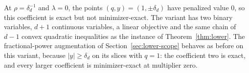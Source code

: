 At $\rho=\delta_d^{-1}$ and $\lambda=0$, the points $(q,y)=(1,\pm\delta_d)$
have penalized value $0$, so this coefficient is exact but not
minimizer-exact. The variant has two binary variables, $d+1$ continuous
variables, a linear objective and the same chain of $d-1$ convex
quadratic inequalities as the instance of Theorem~\ref{thm:lower}. The
fractional-power augmentation of Section~\ref{sec:lower-scope} behaves
as before on this variant, because $|y|\ge\delta_d$ on its slices with
$q=1$: the coefficient two is exact, and every larger coefficient is
minimizer-exact at multiplier zero.
